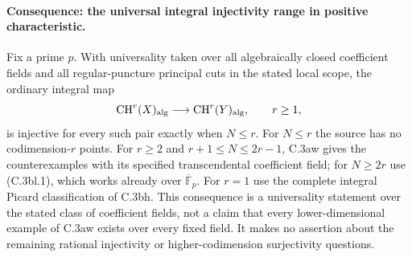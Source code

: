 \paragraph{Consequence: the universal integral injectivity range in positive characteristic.}
Fix a prime $p$. With universality taken over all algebraically
closed coefficient fields and all regular-puncture principal cuts
in the stated local scope, the ordinary integral map
\[
 \mathrm{CH}^r(X)_{\rm alg}\longrightarrow
             \mathrm{CH}^r(Y)_{\rm alg},\qquad r\ge1,
\]
is injective for every such pair exactly when $N\le r$.
For $N\le r$ the source has no codimension-$r$ points.
For $r\ge2$ and $r+1\le N\le2r-1$, C.3aw gives the
counterexamples with its specified transcendental coefficient field;
for $N\ge2r$ use (C.3bl.1), which works already over
$\overline{\mathbb F}_p$. For $r=1$ use the complete integral
Picard classification of C.3bh. This consequence is a universality
statement over the stated class of coefficient fields, not a claim
that every lower-dimensional example of C.3aw exists over every
fixed field. It makes no assertion about the remaining rational
injectivity or higher-codimension surjectivity questions.

